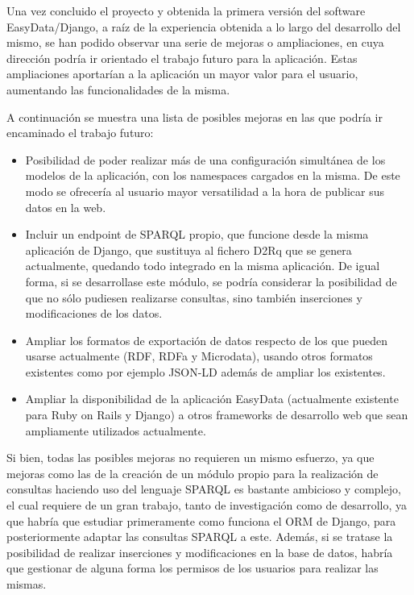 Una vez concluido el proyecto y obtenida la primera versión del software
EasyData/Django, a raíz de la experiencia obtenida a lo largo del desarrollo del
mismo, se han podido observar una serie de mejoras o ampliaciones, en cuya
dirección podría ir orientado el trabajo futuro para la aplicación. Estas
ampliaciones aportarían a la aplicación un mayor valor para el usuario,
aumentando las funcionalidades de la misma.

A continuación se muestra una lista de posibles mejoras en las que podría ir
encaminado el trabajo futuro:
\begin{itemize}
    \item Posibilidad de poder realizar más de una configuración simultánea de
        los modelos de la aplicación, con los namespaces cargados en la misma.
        De este modo se ofrecería al usuario mayor versatilidad a la hora de
        publicar sus datos en la web.
    \item Incluir un endpoint de SPARQL propio, que funcione desde la misma
    	aplicación de Django, que sustituya al fichero D2Rq que se genera
    	actualmente, quedando todo integrado en la misma aplicación. De igual
    	forma, si se desarrollase este módulo, se podría considerar la
    	posibilidad de que no sólo pudiesen realizarse consultas, sino también
        inserciones y modificaciones de los datos.
    \item Ampliar los formatos de exportación de datos respecto de los que
        pueden usarse actualmente (RDF, RDFa y Microdata), usando otros formatos
        existentes como por ejemplo JSON-LD además de ampliar los existentes.
    \item Ampliar la disponibilidad de la aplicación EasyData (actualmente
        existente para Ruby on Rails y Django) a otros frameworks de desarrollo
        web que sean ampliamente utilizados actualmente.
\end{itemize}

Si bien, todas las posibles mejoras no requieren un mismo esfuerzo, ya que
mejoras como las de la creación de un módulo propio para la realización de
consultas haciendo uso del lenguaje SPARQL es bastante ambicioso y complejo, el
cual requiere de un gran trabajo, tanto de investigación como de desarrollo, ya
que habría que estudiar primeramente como funciona el ORM de Django, para
posteriormente adaptar las consultas SPARQL a este. Además, si se tratase la
posibilidad de realizar inserciones y modificaciones en la base de datos, habría
que gestionar de alguna forma los permisos de los usuarios para realizar las
mismas.

